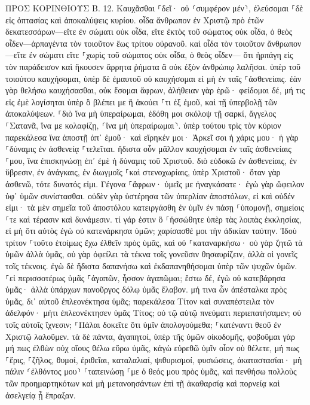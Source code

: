 \documentclass[twoside, 9pt]{extreport}
\begin{document}
ΠΡΟΣ ΚΟΡΙΝΘΙΟΥΣ Β.
12.
Καυχᾶσθαι ⸀δεῖ· οὐ ⸂συμφέρον μέν⸃, ἐλεύσομαι ⸀δὲ εἰς ὀπτασίας καὶ ἀποκαλύψεις κυρίου. 
οἶδα ἄνθρωπον ἐν Χριστῷ πρὸ ἐτῶν δεκατεσσάρων—εἴτε ἐν σώματι οὐκ οἶδα, εἴτε ἐκτὸς τοῦ σώματος οὐκ οἶδα, ὁ θεὸς οἶδεν—ἁρπαγέντα τὸν τοιοῦτον ἕως τρίτου οὐρανοῦ. 
καὶ οἶδα τὸν τοιοῦτον ἄνθρωπον—εἴτε ἐν σώματι εἴτε ⸀χωρὶς τοῦ σώματος οὐκ οἶδα, ὁ θεὸς οἶδεν— 
ὅτι ἡρπάγη εἰς τὸν παράδεισον καὶ ἤκουσεν ἄρρητα ῥήματα ἃ οὐκ ἐξὸν ἀνθρώπῳ λαλῆσαι. 
ὑπὲρ τοῦ τοιούτου καυχήσομαι, ὑπὲρ δὲ ἐμαυτοῦ οὐ καυχήσομαι εἰ μὴ ἐν ταῖς ⸀ἀσθενείαις. 
ἐὰν γὰρ θελήσω καυχήσασθαι, οὐκ ἔσομαι ἄφρων, ἀλήθειαν γὰρ ἐρῶ· φείδομαι δέ, μή τις εἰς ἐμὲ λογίσηται ὑπὲρ ὃ βλέπει με ἢ ἀκούει ⸀τι ἐξ ἐμοῦ, 
καὶ τῇ ὑπερβολῇ τῶν ἀποκαλύψεων. ⸀διὸ ἵνα μὴ ὑπεραίρωμαι, ἐδόθη μοι σκόλοψ τῇ σαρκί, ἄγγελος ⸀Σατανᾶ, ἵνα με κολαφίζῃ, ⸂ἵνα μὴ ὑπεραίρωμαι⸃. 
ὑπὲρ τούτου τρὶς τὸν κύριον παρεκάλεσα ἵνα ἀποστῇ ἀπ᾽ ἐμοῦ· 
καὶ εἴρηκέν μοι· Ἀρκεῖ σοι ἡ χάρις μου· ἡ γὰρ ⸀δύναμις ἐν ἀσθενείᾳ ⸀τελεῖται. ἥδιστα οὖν μᾶλλον καυχήσομαι ἐν ταῖς ἀσθενείαις ⸀μου, ἵνα ἐπισκηνώσῃ ἐπ᾽ ἐμὲ ἡ δύναμις τοῦ Χριστοῦ. 
διὸ εὐδοκῶ ἐν ἀσθενείαις, ἐν ὕβρεσιν, ἐν ἀνάγκαις, ἐν διωγμοῖς ⸀καὶ στενοχωρίαις, ὑπὲρ Χριστοῦ· ὅταν γὰρ ἀσθενῶ, τότε δυνατός εἰμι. 
Γέγονα ⸀ἄφρων· ὑμεῖς με ἠναγκάσατε· ἐγὼ γὰρ ὤφειλον ὑφ᾽ ὑμῶν συνίστασθαι. οὐδὲν γὰρ ὑστέρησα τῶν ὑπερλίαν ἀποστόλων, εἰ καὶ οὐδέν εἰμι· 
τὰ μὲν σημεῖα τοῦ ἀποστόλου κατειργάσθη ἐν ὑμῖν ἐν πάσῃ ⸀ὑπομονῇ, σημείοις ⸀τε καὶ τέρασιν καὶ δυνάμεσιν. 
τί γάρ ἐστιν ὃ ⸀ἡσσώθητε ὑπὲρ τὰς λοιπὰς ἐκκλησίας, εἰ μὴ ὅτι αὐτὸς ἐγὼ οὐ κατενάρκησα ὑμῶν; χαρίσασθέ μοι τὴν ἀδικίαν ταύτην. 
Ἰδοὺ τρίτον ⸀τοῦτο ἑτοίμως ἔχω ἐλθεῖν πρὸς ὑμᾶς, καὶ οὐ ⸀καταναρκήσω· οὐ γὰρ ζητῶ τὰ ὑμῶν ἀλλὰ ὑμᾶς, οὐ γὰρ ὀφείλει τὰ τέκνα τοῖς γονεῦσιν θησαυρίζειν, ἀλλὰ οἱ γονεῖς τοῖς τέκνοις. 
ἐγὼ δὲ ἥδιστα δαπανήσω καὶ ἐκδαπανηθήσομαι ὑπὲρ τῶν ψυχῶν ὑμῶν. ⸀εἰ περισσοτέρως ὑμᾶς ⸀ἀγαπῶν, ἧσσον ἀγαπῶμαι; 
ἔστω δέ, ἐγὼ οὐ κατεβάρησα ὑμᾶς· ἀλλὰ ὑπάρχων πανοῦργος δόλῳ ὑμᾶς ἔλαβον. 
μή τινα ὧν ἀπέσταλκα πρὸς ὑμᾶς, δι᾽ αὐτοῦ ἐπλεονέκτησα ὑμᾶς; 
παρεκάλεσα Τίτον καὶ συναπέστειλα τὸν ἀδελφόν· μήτι ἐπλεονέκτησεν ὑμᾶς Τίτος; οὐ τῷ αὐτῷ πνεύματι περιεπατήσαμεν; οὐ τοῖς αὐτοῖς ἴχνεσιν; 
⸀Πάλαι δοκεῖτε ὅτι ὑμῖν ἀπολογούμεθα; ⸀κατέναντι θεοῦ ἐν Χριστῷ λαλοῦμεν. τὰ δὲ πάντα, ἀγαπητοί, ὑπὲρ τῆς ὑμῶν οἰκοδομῆς, 
φοβοῦμαι γὰρ μή πως ἐλθὼν οὐχ οἵους θέλω εὕρω ὑμᾶς, κἀγὼ εὑρεθῶ ὑμῖν οἷον οὐ θέλετε, μή πως ⸀ἔρις, ⸀ζῆλος, θυμοί, ἐριθεῖαι, καταλαλιαί, ψιθυρισμοί, φυσιώσεις, ἀκαταστασίαι· 
μὴ πάλιν ⸂ἐλθόντος μου⸃ ⸀ταπεινώσῃ ⸀με ὁ θεός μου πρὸς ὑμᾶς, καὶ πενθήσω πολλοὺς τῶν προημαρτηκότων καὶ μὴ μετανοησάντων ἐπὶ τῇ ἀκαθαρσίᾳ καὶ πορνείᾳ καὶ ἀσελγείᾳ ᾗ ἔπραξαν. 
\end{document}
